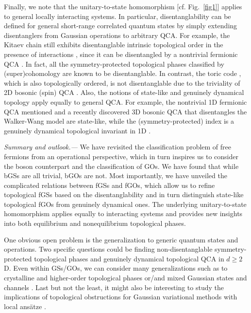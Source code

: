 \documentclass[prl,twocolumn,preprintnumbers,superscriptaddress,amsmath,amssymb]{revtex4-1}
\begin{document}
Finally, we note that the unitary-to-state homomorphism [cf. Fig.~\ref{fig1}] applies to general locally interacting systems. In particular, disentanglability can be defined for general short-range correlated quantum states by simply extending disentanglers from Gaussian operations to arbitrary QCA. 
For example, the Kitaev chain \cite{Kitaev2001} still exhibits disentanglable intrinsic topological order in the presence of interactions \cite{Wen2017}, since it can be disentangled by a nontrivial fermionic QCA \cite{Fidkowski2019,Piroli2021}. In fact, all the symmetry-protected topological phases classified by (super)cohomology \cite{Chen2013,Gu2014,Tantivasadakarn2018,Ellison2019,Chen2021} are known to be disentanglable. In contrast, the toric code \cite{Kitaev2003}, which is also topologically ordered, is not disentanglable due to the triviality of 2D bosonic (spin) QCA \cite{Freedman2020}. %
Also, the notions of state-like and genuinely dynamical topology apply equally to general QCA. For example, the nontrivial 1D fermionic QCA mentioned and a recently discovered 3D bosonic QCA \cite{Haah2018} that disentangles the Walker-Wang model \cite{Walker2012} are state-like, while the (symmetry-protected) index is a genuinely dynamical topological invariant  in 1D \cite{Gross2012,Cirac2017,Chen2018,Gong2020,Ranard2020}.



\emph{Summary and outlook.---} We have revisited the classification problem of free fermions from an operational perspective, which in turn inspires us to consider the boson counterpart and the classification of GOs. We have found that while bGSs are all trivial, bGOs are not. Most importantly, we have unveiled the complicated relations between fGSs and fGOs, which allow us to refine topological fGSs based on the disentanglability and in turn distinguish state-like topological fGOs from genuinely dynamical ones. The underlying unitary-to-state homomorphism applies equally to interacting systems and provides new insights into both equilibrium and nonequilibrium topological phases.

One obvious open problem is the generalization to generic quantum states and operations. Two specific questions could be finding non-disentanglable symmetry-protected topological phases and genuinely dynamical topological QCA in $d\ge2$D. Even within GSs/GOs, we can consider many generalizations such as to crystalline \cite{Fu2011,Slager2013,Shiozaki2014,Slager2017,Khalaf2018} and higher-order \cite{Benalcazar2017,Schindler2018,Trifunovic2019} topological phases or/and mixed Gaussian states and channels \cite{Diehl2013,Budich2015,Mink2019,Altland2021}. Last but not the least, it might also be interesting to study the implications of topological obstructions for Gaussian variational methods with local ans\"atze \cite{Shi2018,Guaita2019,Hackl2020}.
\end{document}
